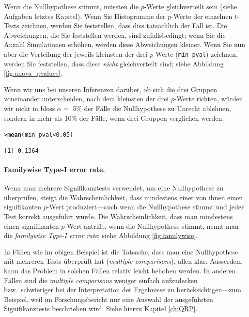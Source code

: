 \documentclass[oneside, 10pt]{book}\usepackage[]{graphicx}\usepackage[]{xcolor}
\makeatletter
\newcommand{\hlnum}[1]{\textcolor[rgb]{0.686,0.059,0.569}{#1}}%
\newcommand{\hlopt}[1]{\textcolor[rgb]{0,0,0}{#1}}%
\newcommand{\hlstd}[1]{\textcolor[rgb]{0.345,0.345,0.345}{#1}}%
\newcommand{\hlkwd}[1]{\textcolor[rgb]{0.737,0.353,0.396}{\textbf{#1}}}%
\newenvironment{kframe}{%
 \def\at@end@of@kframe{}%
 \ifinner\ifhmode%
  \def\at@end@of@kframe{\end{minipage}}%
  \begin{minipage}{\columnwidth}%
 \fi\fi%
 \def\FrameCommand##1{\hskip\@totalleftmargin \hskip-\fboxsep
 \colorbox{shadecolor}{##1}\hskip-\fboxsep
     \hskip-\linewidth \hskip-\@totalleftmargin \hskip\columnwidth}%
 \MakeFramed {\advance\hsize-\width
   \@totalleftmargin\z@ \linewidth\hsize
   \@setminipage}}%
 {\par\unskip\endMakeFramed%
 \at@end@of@kframe}
\newenvironment{knitrout}{}{} %
\makeatother
\begin{document}
Wenn die Nullhypothese stimmt, müssten die $p$-Werte gleichverteilt
sein (siehe Aufgaben letztes Kapitel).
Wenn Sie Histogramme der $p$-Werte der einzelnen
$t$-Tests zeichnen, werden Sie feststellen, dass
dies tatsächlich der Fall ist. Die Abweichungen,
die Sie feststellen werden, sind zufallsbedingt;
wenn Sie die Anzahl Simulationen erhöhen, werden diese Abweichungen kleiner.
Wenn Sie nun aber die Verteilung der jeweils
kleinsten der drei $p$-Werte (\texttt{min\_pval})
zeichnen, werden Sie feststellen, dass diese \emph{nicht}
gleichverteilt sind; siehe Abbildung
\vref{fig:anova_pvalues}.

Wenn wir uns bei unseren Inferenzen darüber, ob sich die drei Gruppen voneinander
unterscheiden, nach dem kleinsten der drei $p$-Werte richten, würden wir nicht
in bloss $\alpha =$ 5\% der Fälle die Nullhypothese zu Unrecht ablehnen,
sondern in mehr als 10\% der Fälle, wenn drei Gruppen verglichen werden:
\begin{knitrout}
\color{fgcolor}\begin{kframe}
\begin{alltt}
\hlstd{> }\hlkwd{mean}\hlstd{(min_pval} \hlopt{<} \hlnum{0.05}\hlstd{)}
\end{alltt}
\begin{verbatim}
[1] 0.1364
\end{verbatim}
\end{kframe}
\end{knitrout}

\paragraph{Familywise Type-I error rate.}
 Wenn man mehrere Signifikanztests verwendet, um eine Nullhypothese
 zu überprüfen, steigt die Wahrscheinlichkeit, dass mindestens einer
 von ihnen einen signifikanten $p$-Wert produziert---auch wenn die Nullhypothese
 stimmt und jeder Test korrekt ausgeführt wurde.
 Die Wahrscheinlichkeit, dass man mindestens einen signifikanten $p$-Wert
 antrifft, wenn die Nullhypothese stimmt, nennt man die \textit{familywise Type-I error rate};
 siehe Abbildung \vref{fig:familywise}.

 In Fällen wie im obigen Beispiel ist die Tatsache, dass man eine Nullhypothese
 mit mehreren Tests überprüft hat (\textit{multiple comparisons}),
 allen klar. Ausserdem kann das Problem in solchen Fällen relativ leicht behoben
 werden. In anderen Fällen sind die \textit{multiple comparisons} weniger einfach
 aufzudecken bzw.\ schwieriger bei der Interpretation der Ergebnisse zu berücksichtigen---zum
 Beispiel, weil im Forschungsbericht nur eine Auswahl der ausgeführten Signifikanztests
 beschrieben wird. Siehe hierzu Kapitel \ref{ch:QRP}.
\end{document}
